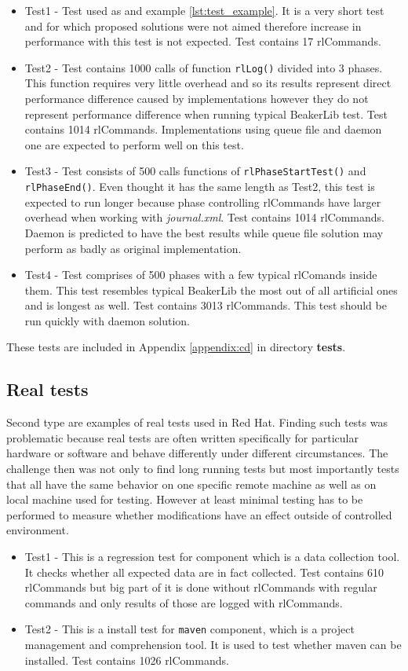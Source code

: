 \begin{itemize}
\item Test1 - Test used as and example \ref{lst:test_example}. It is a very short test and for which proposed solutions were not aimed therefore increase in performance with this test is not expected. Test contains 17 rlCommands.
\item Test2 - Test contains 1000 calls of function \texttt{rlLog()} divided into 3 phases. This function requires very little overhead and so its results represent direct performance difference caused by implementations however they do not represent performance difference when running typical BeakerLib test. Test contains 1014 rlCommands. Implementations using queue file and daemon one are expected to perform well on this test.
\item Test3 - Test consists of 500 calls functions of \texttt{rlPhaseStartTest()} and \texttt{rlPhaseEnd()}. Even thought it has the same length as Test2, this test is expected to run longer because phase controlling rlCommands have larger overhead when working with \textit{journal.xml}. Test contains 1014 rlCommands. Daemon is predicted to have the best results while queue file solution may perform as badly as original implementation. 
\item Test4 - Test comprises of 500 phases with a few typical rlComands inside them. This test resembles typical BeakerLib the most out of all artificial ones and is longest as well. Test contains 3013 rlCommands. This test should be run quickly with daemon solution.
\end{itemize}

These tests are included in Appendix \ref{appendix:cd} in directory \textbf{tests}.

\subsection{Real tests}
Second type are examples of real tests used in Red Hat. Finding such tests was problematic because real tests are often written specifically for particular hardware or software and behave differently under different circumstances. The challenge then was not only to find long running tests but most importantly tests that all have the same behavior on one specific remote machine as well as on local machine used for testing.
However at least minimal testing has to be performed to measure whether modifications have an effect outside of controlled environment.

\begin{itemize}
\item Test1 - This is a regression test for component  which is a data collection tool. It checks whether all expected data are in fact collected. Test contains 610 rlCommands but big part of it is done without rlCommands with regular commands and only results of those are logged with rlCommands.
\item Test2 - This is a install test for \texttt{maven} component, which is a project management and comprehension tool. It is used to test whether maven can be installed. Test contains 1026 rlCommands.
\end{itemize}

